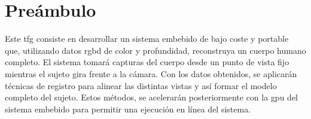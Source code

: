 
\chapter*{Preámbulo}

\thispagestyle{empty}
\vspace{1cm}

Este \gls{tfg} consiste en desarrollar un sistema embebido de bajo coste y portable que, utilizando datos \gls{rgbd} de color y profundidad, reconstruya un cuerpo humano completo.
El sistema tomará capturas del cuerpo desde un punto de vista fijo mientras el sujeto gira frente a la cámara.
Con los datos obtenidos, se aplicarán técnicas de registro para alinear las distintas vistas y así formar el modelo completo del sujeto.
Estos métodos, se acelerarán posteriormente con la \gls{gpu} del sistema embebido para permitir una ejecución en línea del sistema.

\cleardoublepage %


